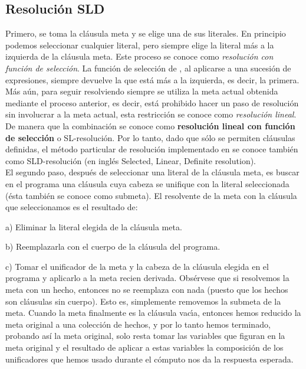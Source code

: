 \documentclass[11pt,letterpaper]{article}
\begin{document}
\subsection{Resoluci\'on SLD}
 
Primero, se toma la cl\'ausula meta y se elige una de sus literales. En
principio podemos seleccionar cualquier literal, pero {\pl} siempre elige
la literal m\'as a la izquierda de la cl\'ausula meta. Este proceso se
conoce como \textit{resoluci\'on con funci\'on de selecci\'on}. La funci\'on
de selecci\'on de {\pl}, al aplicarse a una sucesi\'on de expresiones,
siempre devuelve la que est\'a m\'as a la izquierda, es decir, la
primera. M\'as a\'un, para seguir resolviendo siempre se utiliza la meta
actual obtenida mediante el proceso anterior, es decir, est\'a prohibido
hacer un paso de resoluci\'on sin involucrar a la meta actual, esta
restricci\'on se conoce como \textit{resoluci\'on lineal}. De manera que la
combinaci\'on se conoce como \textbf{resoluci\'on lineal con funci\'on de
selecci\'on} o SL-resoluci\'on. Por lo tanto, dado que s\'olo se
permiten cl\'ausulas definidas, el m\'etodo particular
de resoluci\'on implementado en {\pl} se conoce tambi\'en como
SLD-resoluci\'on (en ingl\'es Selected, Linear, Definite resolution).\\
El segundo paso, despu\'es de seleccionar una literal de la cl\'ausula meta,
es buscar en el programa una cl\'ausula cuya cabeza se unifique con la
literal seleccionada (\'esta tambi\'en se conoce como submeta). El
resolvente de la meta con la cl\'ausula que seleccionamos es el resultado
de:
\bi
\item[a)] Eliminar la literal elegida de la cl\'ausula meta.
\item[b)] Reemplazarla con el cuerpo de la cl\'ausula del programa.
\item[c)] Tomar el unificador de la meta y la cabeza de la cl\'ausula
elegida en el programa y aplicarlo a la meta recien derivada.   
\ei 
Obs\'ervese que si resolvemos la meta con un hecho, entonces no se
reemplaza con nada (puesto que los hechos son cl\'ausulas sin cuerpo). Esto
es, simplemente removemos la submeta de la meta. Cuando la meta finalmente
es la cl\'ausula vac\'{\i}a, entonces hemos reducido la meta original a una
colecci\'on de hechos, y por lo tanto hemos terminado, probando as\'i la meta
original, solo resta tomar las variables que figuran en la meta original y el
resultado de aplicar a estas variables la composici\'on de los unificadores
que hemos usado durante el c\'omputo nos da la respuesta esperada.
\end{document}
